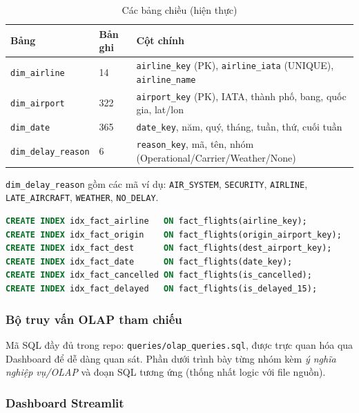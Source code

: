\begin{table}[H]
\centering
\caption{Các bảng chiều (hiện thực)}
\vspace{4pt}
\begin{tabular}{|l|l|l|}
\hline
\textbf{Bảng} & \textbf{Bản ghi} & \textbf{Cột chính} \\ \hline
\texttt{dim\_airline}       & 14  & \texttt{airline\_key} (PK), \texttt{airline\_iata} (UNIQUE), \texttt{airline\_name} \\ \hline
\texttt{dim\_airport}       & 322 & \texttt{airport\_key} (PK), IATA, thành phố, bang, quốc gia, lat/lon \\ \hline
\texttt{dim\_date}          & 365 & \texttt{date\_key}, năm, quý, tháng, tuần, thứ, cuối tuần \\ \hline
\texttt{dim\_delay\_reason} & 6   & \texttt{reason\_key}, mã, tên, nhóm (Operational/Carrier/Weather/None) \\ \hline
\end{tabular}
\label{tab:dimensions_impl}
\end{table}

\texttt{dim\_delay\_reason} gồm các mã ví dụ:
\texttt{AIR\_SYSTEM}, \texttt{SECURITY}, \texttt{AIRLINE}, \texttt{LATE\_AIRCRAFT}, \texttt{WEATHER}, \texttt{NO\_DELAY}.

\begin{lstlisting}[language=SQL, caption={Chỉ mục hỗ trợ OLAP trên \texttt{fact\_flights}}]
CREATE INDEX idx_fact_airline   ON fact_flights(airline_key);
CREATE INDEX idx_fact_origin    ON fact_flights(origin_airport_key);
CREATE INDEX idx_fact_dest      ON fact_flights(dest_airport_key);
CREATE INDEX idx_fact_date      ON fact_flights(date_key);
CREATE INDEX idx_fact_cancelled ON fact_flights(is_cancelled);
CREATE INDEX idx_fact_delayed   ON fact_flights(is_delayed_15);
\end{lstlisting}

\subsubsection{Bộ truy vấn OLAP tham chiếu}

Mã SQL đầy đủ trong repo: \texttt{queries/olap\_queries.sql}, được trực quan hóa qua Dashboard để dễ dàng quan sát.
Phần dưới trình bày từng nhóm kèm \emph{ý nghĩa nghiệp vụ/OLAP} và đoạn SQL tương ứng (thống nhất logic với file nguồn).



\subsubsection{Dashboard Streamlit}

